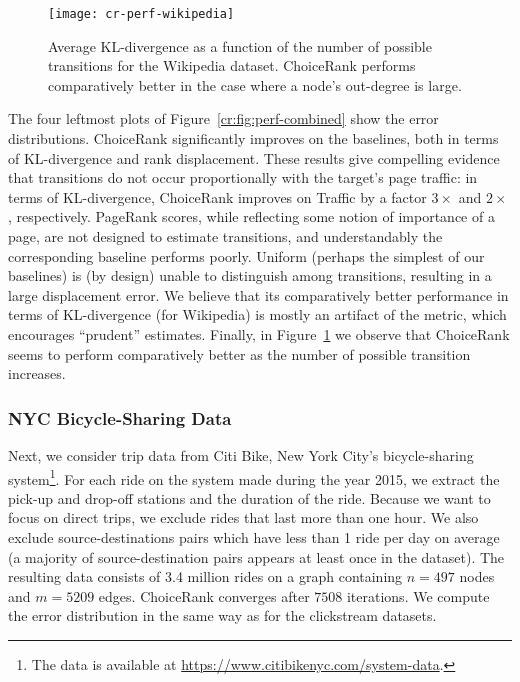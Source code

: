 \begin{figure}[t]
  \centering
  \texttt{[image: cr-perf-wikipedia]}
  \caption{
Average KL-divergence as a function of the number of possible transitions for the Wikipedia dataset.
ChoiceRank performs comparatively better in the case where a node's out-degree is large.
}
  \label{cr:fig:perf-wikipedia}
\end{figure}

The four leftmost plots of Figure~\ref{cr:fig:perf-combined} show the error distributions.
ChoiceRank significantly improves on the baselines, both in terms of KL-divergence and rank displacement.
These results give compelling evidence that transitions do not occur proportionally with the target's page traffic: in terms of KL-divergence, ChoiceRank improves on Traffic by a factor $3\times$ and $2\times$, respectively.
PageRank scores, while reflecting some notion of importance of a page, are not designed to estimate transitions, and understandably the corresponding baseline performs poorly.
Uniform (perhaps the simplest of our baselines) is (by design) unable to distinguish among transitions, resulting in a large displacement error.
We believe that its comparatively better performance in terms of KL-divergence (for Wikipedia) is mostly an artifact of the metric, which encourages ``prudent'' estimates.
Finally, in Figure~\ref{cr:fig:perf-wikipedia} we observe that ChoiceRank seems to perform comparatively better as the number of possible transition increases.


\subsubsection{NYC Bicycle-Sharing Data}

Next, we consider trip data from Citi Bike, New York City's bicycle-sharing system\footnote{The data is available at \url{https://www.citibikenyc.com/system-data}.}.
For each ride on the system made during the year 2015, we extract the pick-up and drop-off stations and the duration of the ride.
Because we want to focus on direct trips, we exclude rides that last more than one hour.
We also exclude source-destinations pairs which have less than 1 ride per day on average (a majority of source-destination pairs appears at least once in the dataset).
The resulting data consists of \num{3.4} million rides on a graph containing $n = \num{497}$ nodes and $m = \num{5209}$ edges.
ChoiceRank converges after $\num{7508}$ iterations.
We compute the error distribution in the same way as for the clickstream datasets.

